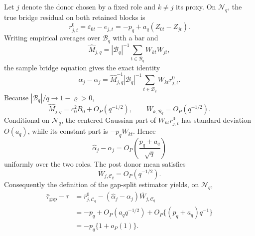 Let \(j\) denote the donor chosen by a fixed role and \(k\neq j\) its proxy.  On \(\mathcal N_q\), the true bridge residual on both retained blocks is
\[
 r_{j,t}^0=\varepsilon_{0t}-e_{j,t}
 =-p_q+a_q(Z_{0t}-Z_{jt}).
\]
Writing empirical averages over \(\mathcal B_q\) with a bar and
\[
 \widehat M_{j,q}
 =|\mathcal B_q|^{-1}\sum_{t\in\mathcal B_q}W_{kt}W_{jt},
\]
the sample bridge equation gives the exact identity
\[
 \widehat\alpha_j-\alpha_j
 =\widehat M_{j,q}^{-1}
   |\mathcal B_q|^{-1}
   \sum_{t\in\mathcal B_q}W_{kt}r_{j,t}^0.
\]
Because \(|\mathcal B_q|/q\to1-\varrho>0\),
\[
 \widehat M_{j,q}=c_0^2B_0+O_P(q^{-1/2}),
\qquad
 \overline W_{k,\mathcal B_q}=O_P(q^{-1/2}).
\]
Conditional on \(\mathcal N_q\), the centered Gaussian part of
\(W_{kt}r_{j,t}^0\) has standard deviation \(O(a_q)\), while its constant part is \(-p_qW_{kt}\).  Hence
\[
 \widehat\alpha_j-\alpha_j
 =O_P\!\left(\frac{p_q+a_q}{\sqrt q}\right)
\]
uniformly over the two roles.  The post donor mean satisfies
\[
 \overline W_{j,\mathcal C_q}=O_P(q^{-1/2}).
\]
Consequently the definition of the gap-split estimator yields, on \(\mathcal N_q\),
\[
 \begin{aligned}
 \widehat\tau_{\mathrm{gap}}-\tau
 &=\overline r^0_{j,\mathcal C_q}
   -(\widehat\alpha_j-\alpha_j)
     \overline W_{j,\mathcal C_q}\\
 &=-p_q+O_P(a_q q^{-1/2})
   +O_P\{(p_q+a_q)q^{-1}\}\\
 &=-p_q\{1+o_P(1)\}.
 \end{aligned}
\]

